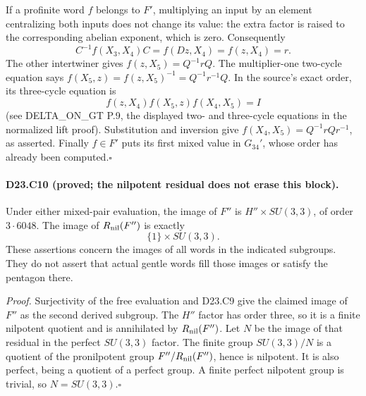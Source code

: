 If a profinite word $f$ belongs to $F'$, multiplying an input by
an element centralizing both inputs does not change its value:
the extra factor is raised to the corresponding abelian exponent,
which is zero.  Consequently
\[
 C^{-1}f(X_3,X_4)C=f(Dz,X_4)=f(z,X_4)=r.
\]
The other intertwiner gives
$f(z,X_5)=Q^{-1}rQ$.  The multiplier-one two-cycle equation says
$f(X_5,z)=f(z,X_5)^{-1}=Q^{-1}r^{-1}Q$.  In the source's exact
order, its three-cycle equation is
\[
 f(z,X_4)f(X_5,z)f(X_4,X_5)=I
\]
(see DELTA\_ON\_GT P.9, the displayed two- and three-cycle
equations in the normalized lift proof).  Substitution and inversion
give $f(X_4,X_5)=Q^{-1}rQr^{-1}$, as asserted.  Finally
$f\in F'$ puts its first mixed value in $G_{34}'$, whose order
has already been computed.\hfill$\square$

\paragraph{D23.C10 (proved; the nilpotent residual does not erase this block).}
Under either mixed-pair evaluation, the image of $F''$ is
$H''\times SU(3,3)$, of order $3\cdot6048$.  The image of
$R_{\rm nil}(F'')$ is exactly
\[
 \{1\}\times SU(3,3).
\]
These assertions concern the images of all words in the indicated
subgroups.  They do not assert that actual gentle words fill those
images or satisfy the pentagon there.

\emph{Proof.}
Surjectivity of the free evaluation and D23.C9 give the claimed
image of $F''$ as the second derived subgroup.  The $H''$ factor
has order three, so it is a finite nilpotent quotient and is
annihilated by $R_{\rm nil}(F'')$.  Let $N$ be the image of that
residual in the perfect $SU(3,3)$ factor.  The finite group
$SU(3,3)/N$ is a quotient of the pronilpotent group
$F''/R_{\rm nil}(F'')$, hence is nilpotent.  It is also perfect,
being a quotient of a perfect group.  A finite perfect nilpotent
group is trivial, so $N=SU(3,3)$.\hfill$\square$
